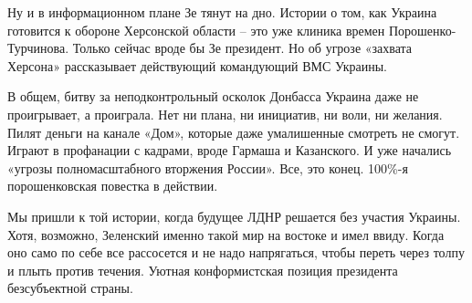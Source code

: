 Ну и в информационном плане Зе тянут на дно. Истории о том, как Украина
готовится к обороне Херсонской области – это уже клиника времен
Порошенко-Турчинова. Только сейчас вроде бы Зе президент. Но об угрозе «захвата
Херсона» рассказывает действующий командующий ВМС Украины.

В общем, битву за неподконтрольный осколок Донбасса Украина даже не
проигрывает, а проиграла. Нет ни плана, ни инициатив, ни воли, ни желания.
Пилят деньги на канале «Дом», которые даже умалишенные смотреть не смогут.
Играют в профанации с кадрами, вроде Гармаша и Казанского. И уже начались
«угрозы полномасштабного вторжения России». Все, это конец. 100\%-я
порошенковская повестка в действии.

Мы пришли к той истории, когда будущее ЛДНР решается без участия Украины. Хотя,
возможно, Зеленский именно такой мир на востоке и имел ввиду. Когда оно само по
себе все рассосется и не надо напрягаться, чтобы переть через толпу и плыть
против течения. Уютная конформистская позиция президента безсубъектной страны.
